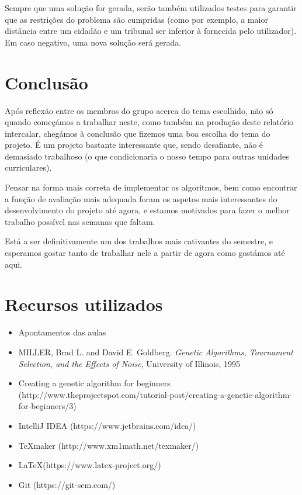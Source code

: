 \documentclass[11pt,a4paper,reqno]{article}
\numberwithin{equation}{section}
\begin{document}
Sempre que uma solução for gerada, serão também utilizados testes para garantir que as restrições do problema são cumpridas (como por exemplo, a maior distância entre um cidadão e um tribunal ser inferior à fornecida pelo utilizador). Em caso negativo, uma nova solução será gerada.



\newpage

\section{Conclusão}
Após reflexão entre os membros do grupo acerca do tema escolhido, não só quando começámos a trabalhar neste, como também na produção deste relatório intercalar, chegámos à conclusão que fizemos uma boa escolha do tema do projeto. É um projeto bastante interessante que, sendo desafiante, não é demasiado trabalhoso (o que condicionaria o nosso tempo para outras unidades curriculares).

Pensar na forma mais correta de implementar os algoritmos, bem como encontrar a função de avaliação mais adequada foram os aspetos mais interessantes do desenvolvimento do projeto até agora, e estamos motivados para fazer o melhor trabalho possível nas semanas que faltam.

Está a ser definitivamente um dos trabalhos mais cativantes do semestre, e esperamos gostar tanto de trabalhar nele a partir de agora como gostámos até aqui.


\newpage

\section{Recursos utilizados}

\begin{itemize}
\item Apontamentos das aulas
\item MILLER, Brad L. and David E. Goldberg. \textit{Genetic Algorithms, Tournament Selection, and the Effects of Noise}, University of Illinois, 1995\item Creating a genetic algorithm for beginners (http://www.theprojectspot.com/tutorial-post/creating-a-genetic-algorithm-for-beginners/3)
\item IntelliJ IDEA (https://www.jetbrains.com/idea/)
\item TeXmaker (http://www.xm1math.net/texmaker/)
\item LaTeX(https://www.latex-project.org/)
\item Git (https://git-scm.com/)

\end{itemize}
\end{document}
